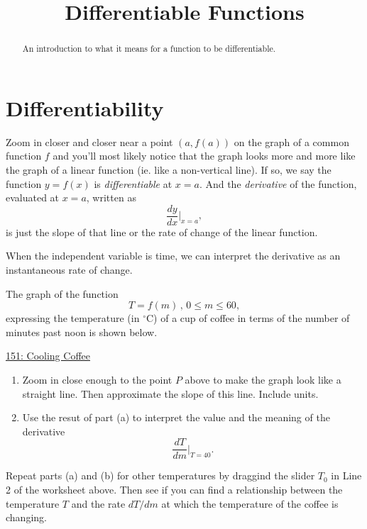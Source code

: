 \documentclass{ximera}
\title{Differentiable Functions}
\begin{document}
\begin{abstract}
An introduction to what it means for a function to be differentiable.
\end{abstract}
\maketitle

\section{Differentiability}
Zoom in closer and closer near a point $(a,f(a))$ on the graph of a common function $f$ and you'll most likely notice that the graph looks more and more like the graph of a linear function (ie. like a non-vertical line). If so, we say the function $y=f(x)$ is \emph{differentiable} at $x=a$. And the \emph{derivative} of the function, evaluated at $x=a$, written as
\[
     \frac{dy}{dx}\Big|_{x=a},
\]
is just the slope of that line or the rate of change of the linear function.

When the independent variable is time, we can interpret the derivative as an instantaneous rate of change.

\begin{example}  \label{Ex:KJDmft4thghhgdf}
The graph of the function 
\[
   T = f(m) \, ,  \, 0\leq m \leq 60,
\]
expressing the temperature (in $^\circ$C) of a cup of coffee in terms of the number of minutes past noon is shown below.

\begin{onlineOnly}
    \begin{center}
\end{center}
\end{onlineOnly}

\href{https://www.desmos.com/calculator/fuftb4mq0k}{151: Cooling Coffee}


\begin{enumerate}
\item Zoom in close enough to the point $P$ above to make the graph look like a straight line. Then approximate the slope of this line. Include units.

\item Use the resut of part (a) to interpret the value and the meaning of the derivative
\[
   \frac{dT}{dm} \Big|_{T=40} .
\]
\end{enumerate}

\item Repeat parts (a) and (b) for other temperatures by draggind the slider $T_0$ in Line 2 of the worksheet above. Then see if you can find a relationship between the temperature $T$ and the rate $dT/dm$ at which the temperature of the coffee is changing. 


\end{example}
\end{document}
